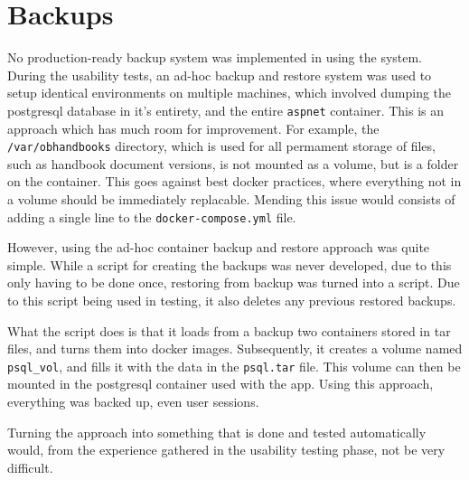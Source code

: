 \section{Backups}
No production-ready backup system was implemented in using the system.
During the usability tests, an ad-hoc backup and restore system was used to setup identical environments on multiple machines, which involved dumping the postgresql database in it's entirety, and the entire \texttt{aspnet} container.
This is an approach which has much room for improvement.
For example, the \texttt{/var/obhandbooks} directory, which is used for all permament storage of files, such as handbook document versions, is not mounted as a volume, but is a folder on the container.
This goes against best docker practices, where everything not in a volume should be immediately replacable.
Mending this issue would consists of adding a single line to the \texttt{docker-compose.yml} file.

However, using the ad-hoc container backup and restore approach was quite simple.
While a script for creating the backups was never developed, due to this only having to be done once, restoring from backup was turned into a script.
Due to this script being used in testing, it also deletes any previous restored backups.

What the script does is that it loads from a backup two containers stored in tar files, and turns them into docker images.
Subsequently, it creates a volume named \texttt{psql_vol}, and fills it with the data in the \texttt{psql.tar} file.
This volume can then be mounted in the postgresql container used with the app.
Using this approach, everything was backed up, even user sessions.

Turning the approach into something that is done and tested automatically would, from the experience gathered in the usability testing phase, not be very difficult.
